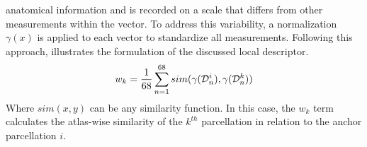 anatomical information and is recorded on a scale that differs from other
measurements within the vector. To address this variability, a
normalization
$\gamma(x)$ is applied to each vector to standardize all measurements.
Following this approach,  illustrates the formulation of the
discussed local descriptor.
\begin{equation}
    \labeq{4_8}
    w_k = \frac{1}{68}\sum_{n=1}^{68} sim(\gamma(\mathcal{D}^i_n), \gamma(\mathcal{D}^k_n))
\end{equation}
Where $sim(x, y)$ can be any similarity function. In this case, the $w_k$ term
calculates the atlas-wise similarity of the $k^{th}$ parcellation in relation to
the anchor parcellation $i$.

